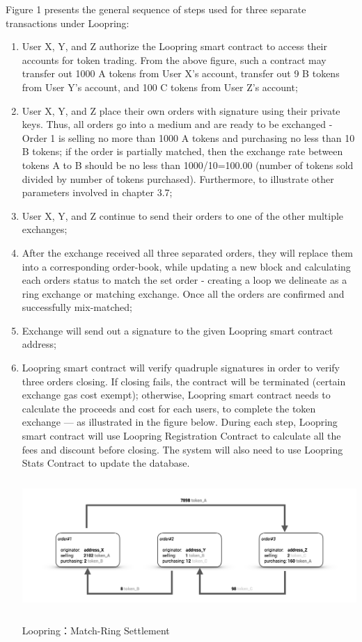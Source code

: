\documentclass[UTF8,nofonts]{article}
\makeatletter
\newenvironment{figurehere}
 {\def\@captype{figure}}
 {}
\makeatother
\begin{document}
Figure 1 presents the general sequence of steps used for three separate transactions under Loopring:

\begin{enumerate}
 \item User X, Y, and Z authorize the Loopring smart contract to access their accounts for token trading. From the above figure, such a contract may transfer out 1000 A tokens from User X's account, transfer out 9 B tokens from User Y's account, and 100 C tokens from User Z's account;
 \item User X, Y, and Z place their own orders with signature using their private keys. Thus, all orders go into a medium and are ready to be exchanged - Order 1 is selling no more than 1000 A tokens and purchasing no less than 10 B tokens; if the order is partially matched,  then the exchange rate between tokens A to B should be no less than 1000/10=100.00 (number of tokens sold divided by number of tokens purchased). Furthermore, to illustrate other parameters involved in chapter 3.7;
 \item User X, Y, and Z continue to send their orders to one of the other multiple exchanges;
 \item After the exchange received all three separated orders, they will replace them into a corresponding order-book, while updating a new block and calculating each orders status to match the set order - creating a loop we delineate as a ring exchange or matching exchange. Once all the orders are confirmed and successfully mix-matched;
 \item Exchange will send out a signature to the given Loopring smart contract address;
 \item Loopring smart contract will verify quadruple signatures in order to verify three orders closing. If closing fails, the contract will be terminated (certain exchange gas cost exempt); otherwise, Loopring smart contract needs to calculate the proceeds and cost for each users, to complete the token exchange --- as illustrated in the figure below. During each step, Loopring smart contract will use Loopring Registration Contract to calculate all the fees and discount before closing. The system will also need to use Loopring Stats Contract to update the database.

\begin{center}
\begin{figurehere}
\includegraphics[height=5cm]{images/en-Loopring-example.png}
\caption{Loopring：Match-Ring Settlement}
\label{fig:Loopringprotocol}
\end{figurehere}
\end{center}
  

\end{enumerate}
\end{document}
